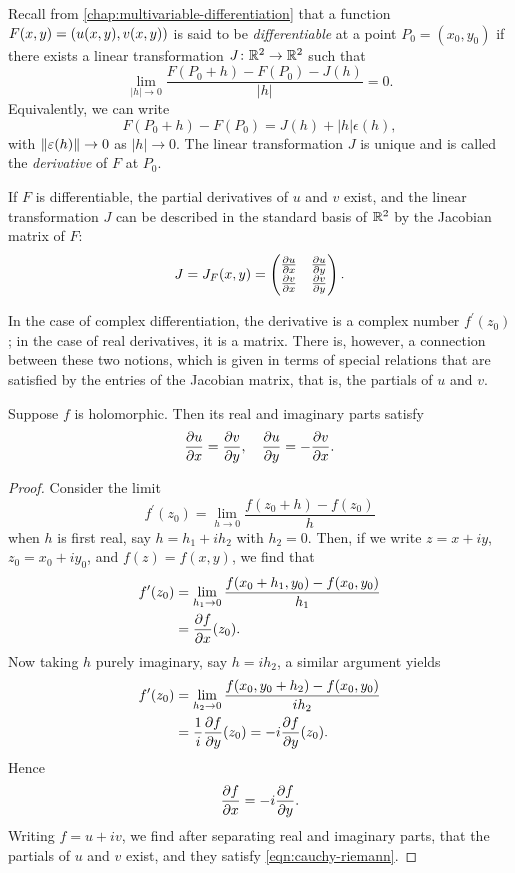 Recall from \cref{chap:multivariable-differentiation} that a function $F(x,y)=\left(u(x, y),v(x,y)\right)$ is said to be \emph{differentiable} at a point $P_0=(x_0,y_0)$ if there exists a linear transformation $J\colon\mathbb R^2\to\mathbb R^2$ such that
\[\lim_{|h|\to 0}\frac{F(P_0+h)-F(P_0)-J(h)}{|h|}=0.\]
Equivalently, we can write
\[F(P_0+h)-F(P_0)=J(h)+|h|\epsilon(h),\]
with $\norm{\varepsilon(h)}\to 0$ as $|h|\to 0$. The linear transformation $J$ is unique and is called the \emph{derivative} of $F$ at $P_0$. 

If $F$ is differentiable, the partial derivatives of $u$ and $v$ exist, and the linear transformation $J$ can be described in the standard basis of $\mathbb R^2$ by the Jacobian matrix of $F$:
\[J=J_F(x,y)=\begin{pmatrix}
\pdv{u}{x}&\pdv{u}{y}\\
\pdv{v}{x}&\pdv{v}{y}
\end{pmatrix}.\]

In the case of complex differentiation, the derivative is a complex number $f^\prime(z_0)$; in the case of real derivatives, it is a matrix. There is, however, a connection between these two notions, which is given in terms of special relations that are satisfied by the entries of the Jacobian matrix, that is, the partials of $u$ and $v$.

\begin{theorem}
Suppose $f$ is holomorphic. Then its real and imaginary parts satisfy
\begin{equation}\label{eqn:cauchy-riemann}
\pdv{u}{x}=\pdv{v}{y},\quad\pdv{u}{y}=-\pdv{v}{x}.
\end{equation}
\end{theorem}

\begin{proof}
Consider the limit
\[f^\prime(z_0)=\lim_{h\to0}\frac{f(z_0+h)-f(z_0)}{h}\]
when $h$ is first real, say $h=h_1+ih_2$ with $h_2=0$. Then, if we write $z=x+iy$, $z_0=x_0+iy_0$, and $f(z)=f(x,y)$, we find that
\begin{align*}
f^\prime(z_0)&=\lim_{h_1\to 0}\frac{f(x_0+h_1,y_0)-f(x_0,y_0)}{h_1}\\
&=\pdv{f}{x}(z_0).
\end{align*}
Now taking $h$ purely imaginary, say $h=ih_2$, a similar argument yields
\begin{align*}
f^\prime(z_0)&=\lim_{h_2\to 0}\frac{f(x_0,y_0+h_2)-f(x_0,y_0)}{ih_2}\\
&=\frac{1}{i}\pdv{f}{y}(z_0)
=-i\pdv{f}{y}(z_0).
\end{align*}
Hence
\[\pdv{f}{x}=-i\pdv{f}{y}.\]
Writing $f=u+iv$, we find after separating real and imaginary parts, that the partials of $u$ and $v$ exist, and they satisfy \eqref{eqn:cauchy-riemann}.
\end{proof}

